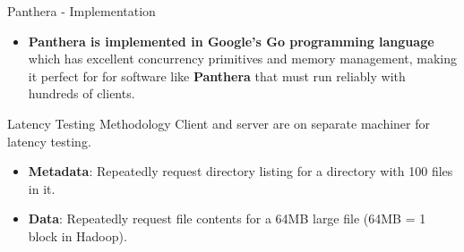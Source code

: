 \documentclass[final]{beamer} %
\begin{document}
\begin{frame}
\begin{columns}[t]
\begin{column}{0.32\textwidth}

	\begin{block}{Panthera - Implementation}
	\begin{itemize}
		\item \textbf{Panthera is implemented in Google's Go programming language} which has excellent concurrency primitives and memory management, making it perfect for
		for software like \textbf{Panthera} that must run reliably with hundreds of clients.
	\end{itemize}
	\end{block}
	
	\begin{block}{Latency Testing Methodology}
	Client and server are on separate machiner for latency testing.
	\begin{itemize}
		\item \textbf{Metadata}: Repeatedly request directory listing for a directory with 100 files in it.
		\item \textbf{Data}: Repeatedly request file contents for a 64MB large file (64MB = 1 block in Hadoop).
	\end{itemize}


\end{block}
\end{column}
\end{columns}
\end{frame}
\end{document}

